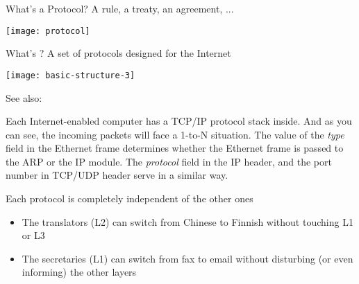 \begin{frame}
  \begin{minipage}[t]{.47\linewidth}
    \begin{iblock}{What's a Protocol?}
      A rule, a treaty, an agreement, ...
      \begin{center}
        \texttt{[image: protocol]}%
      \end{center}
    \end{iblock}
  \end{minipage}\hfill
  \begin{minipage}[t]{.47\linewidth}
    \begin{iblock}{What's \tcpip{}?}
      A set of protocols designed for the Internet
      \begin{center}
        \texttt{[image: basic-structure-3]}%
      \end{center}
    \end{iblock}
  \end{minipage}
\end{frame}

See also: 

Each Internet-enabled computer has a TCP/IP protocol stack inside. And as you can see, the
incoming packets will face a 1-to-N situation. The value of the \emph{type} field in the
Ethernet frame determines whether the Ethernet frame is passed to the ARP or the IP
module. The \emph{protocol} field in the IP header, and the port number in TCP/UDP header
serve in a similar way.

\begin{frame}
  \begin{minipage}{.6\linewidth}
    \centering%
    \label{fig:translator}%
  \end{minipage}\quad
  \begin{minipage}{.35\linewidth}
    Each protocol is completely independent of the other ones
    \begin{itemize}
    \item The translators (L2) can switch from Chinese to Finnish without touching L1 or
      L3
    \item The secretaries (L1) can switch from fax to email without disturbing (or even
      informing) the other layers
    \end{itemize}
  \end{minipage}
\end{frame}

